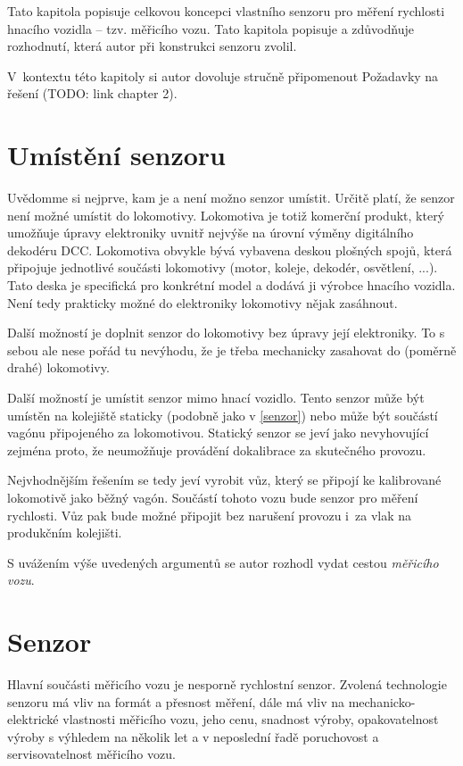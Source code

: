 Tato kapitola popisuje celkovou koncepci vlastního senzoru pro měření
rychlosti hnacího vozidla -- tzv. měřicího vozu. Tato kapitola popisuje
a zdůvodňuje rozhodnutí, která autor při konstrukci senzoru zvolil.

V~kontextu této kapitoly si autor dovoluje stručně připomenout Požadavky
na řešení (TODO: link chapter 2).

\section{Umístění senzoru}

Uvědomme si nejprve, kam je a není možno senzor umístit. Určitě platí, že
senzor není možné umístit do lokomotivy. Lokomotiva je totiž komerční produkt,
který umožňuje úpravy elektroniky uvnitř nejvýše na úrovní výměny digitálního
dekodéru DCC. Lokomotiva obvykle bývá vybavena deskou plošných spojů, která
připojuje jednotlivé součásti lokomotivy (motor, koleje, dekodér, osvětlení,
...). Tato deska je specifická pro konkrétní model a dodává ji výrobce hnacího
vozidla. Není tedy prakticky možné do elektroniky lokomotivy nějak zasáhnout.

Další možností je doplnit senzor do lokomotivy bez úpravy její elektroniky.
To s sebou ale nese pořád tu nevýhodu, že je třeba mechanicky zasahovat do
(poměrně drahé) lokomotivy.

Další možností je umístit senzor mimo hnací vozidlo. Tento senzor může být
umístěn na kolejiště staticky (podobně jako v \ref{senzor}) nebo může
být součástí vagónu připojeného za lokomotivou. Statický senzor se jeví jako
nevyhovující zejména proto, že neumožňuje provádění dokalibrace za skutečného
provozu.

Nejvhodnějším řešením se tedy jeví vyrobit vůz, který se připojí ke kalibrované
lokomotivě jako běžný vagón. Součástí tohoto vozu bude senzor pro měření
rychlosti. Vůz pak bude možné připojit bez narušení provozu i~za vlak na
produkčním kolejišti.

S uvážením výše uvedených argumentů se autor rozhodl vydat cestou
\textit{měřicího vozu}.

\section{Senzor}

Hlavní součásti měřicího vozu je nesporně rychlostní senzor. Zvolená
technologie senzoru má vliv na formát a přesnost měření, dále má vliv na
mechanicko-elektrické vlastnosti měřicího vozu, jeho cenu, snadnost výroby,
opakovatelnost výroby s výhledem na několik let a v neposlední řadě poruchovost
a servisovatelnost měřicího vozu.

